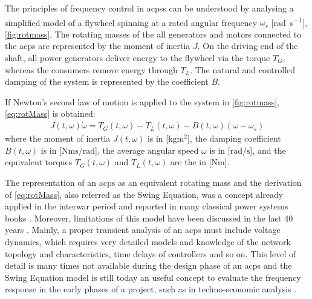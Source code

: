 \documentclass[utf8]{frontiersSCNS} %
\begin{document}
The principles of frequency control in \glspl{acps} can be understood by analysing a simplified model of a flywheel spinning at a rated angular frequency $\omega_s$ [\si{\radian\per\second}], \cref{fig:rotmass}. The rotating masses of the all generators and motors connected to the \gls{acps} are represented by the moment of inertia $J$. On the driving end of the shaft, all power generators deliver energy to the flywheel via the torque $T_G$, whereas the consumers remove energy through $T_L$. The natural and controlled damping of the system is represented by the coefficient $B$.

If Newton's second law of motion is applied to the system in \cref{fig:rotmass}, \cref{eq:rotMass} is obtained:
\begin{align}\label{eq:rotMass}
	J(t,\omega) \dot{\omega} = T_G(t,\omega) - T_L(t,\omega) - B(t,\omega) (\omega - \omega_s)
\end{align}
where the moment of inertia $J (t,\omega)$ is in [$\si{\kilogram\metre^2}$], the damping coefficient $B (t,\omega)$ is in [$\si{\newton\metre\second\per\radian}$], the average angular speed $ \omega $ is in [$\si{\radian\per\second}$], and the equivalent torques $ T_G(t,\omega) $ and $ T_L(t,\omega) $ are the in [$\si{\newton\metre}$].

The representation of an \gls{acps} as an equivalent rotating mass and the derivation of \cref{eq:rotMass}, also referred as the Swing Equation, was a concept already applied in the interwar period \citep{dohertySynchronousMachinesIII1927} and reported in many classical power systems books \citep{concordiaSynchronousMachinesTheory1951,graingerPowerSystemAnalysis1994,kimbarkPowerSystemStability1995,KundurPowersystemstability1994,machowskiPowerSystemDynamics2008}. Moreover, limitations of this model have been discussed in the last 40 years \citep{tavoraCharacterizationEquilibriumStability1972,caliskanUsesAbusesSwing2015}. Mainly, a proper transient analysis of an \gls{acps} must include voltage dynamics, which requires very detailed models and knowledge of the network topology and characteristics, time delays of controllers and so on. This level of detail is many times not available during the design phase of an \gls{acps} and the Swing Equation model is still today an useful concept to evaluate the frequency response in the early phases of a project, such as in techno-economic analysis \citep{alvesSmartLoadManagement2019}.
\end{document}

